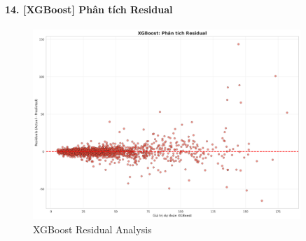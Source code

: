 \documentclass[12pt,a4paper]{article}
\begin{document}
\paragraph{14. [XGBoost] Phân tích Residual}

\begin{figure}[H]
\centering
\includegraphics[width=0.9\textwidth]{results_comb_PM25_Hanoi_2018_sm_20251011_121424/20251011_121424_xgb_residual_plot.png}
\caption{XGBoost Residual Analysis}
\end{figure}
\end{document}
